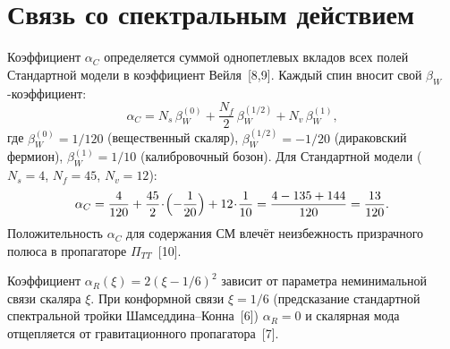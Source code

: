 \documentclass[12pt,a4paper]{article}
\theoremstyle{plain}
\theoremstyle{definition}
\begin{document}
\section{Связь со спектральным действием}\label{app:spectral}

Коэффициент $\alpha_C$ определяется суммой однопетлевых
вкладов всех полей Стандартной модели в коэффициент Вейля~[8,9].
Каждый спин вносит свой $\beta_W$-коэффициент:
\begin{equation}\label{eq:alphaC}
  \alpha_C
  = N_s\,\beta_W^{(0)} + \frac{N_f}{2}\,\beta_W^{(1/2)} + N_v\,\beta_W^{(1)},
\end{equation}
где $\beta_W^{(0)} = 1/120$ (вещественный скаляр),
$\beta_W^{(1/2)} = -1/20$ (дираковский фермион),
$\beta_W^{(1)} = 1/10$ (калибровочный бозон).
Для Стандартной модели ($N_s = 4$, $N_f = 45$, $N_v = 12$):
\begin{equation}
  \alpha_C
  = \frac{4}{120} + \frac{45}{2}\!\cdot\!\Bigl(-\frac{1}{20}\Bigr)
  + 12\!\cdot\!\frac{1}{10}
  = \frac{4 - 135 + 144}{120}
  = \frac{13}{120}.
\end{equation}
Положительность $\alpha_C$ для содержания СМ
влечёт неизбежность призрачного полюса в пропагаторе
$\Pi_{TT}$~[10].

Коэффициент $\alpha_R(\xi) = 2(\xi - 1/6)^2$ зависит от параметра
неминимальной связи скаляра $\xi$. При конформной связи
$\xi = 1/6$ (предсказание стандартной спектральной тройки Шамседдина--Конна~[6])
$\alpha_R = 0$ и скалярная мода отщепляется от гравитационного
пропагатора~[7].

\end{document}
